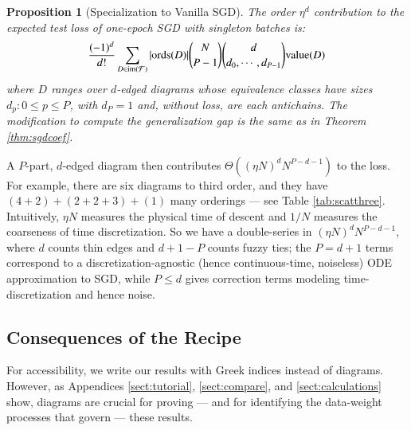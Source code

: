 \documentclass{article}
\theoremstyle{plain}
\newtheorem{prop}{Proposition}
\theoremstyle{definition}
\newcommand{\Free}{\mathcal{F}}
\newcommand{\image}{\text{\textnormal{im}}}
\newcommand{\dvalue}{\text{\textnormal{value}}}
\newcommand{\ords}{\text{\textnormal{ords}}}
\begin{document}
        \begin{prop}[Specialization to Vanilla SGD] \label{prop:vanilla}
            The order $\eta^d$ contribution to the expected test loss of
            one-epoch SGD with singleton batches is:
            \begin{equation*}\label{eq:sgdbasiccoef}
                \frac{(-1)^d}{d!} \sum_{D\in \image(\Free)} 
                |\ords(D)| {N \choose P-1} {d \choose d_0,\cdots,d_{P-1}}
                \dvalue(D)
            \end{equation*}
            where $D$ ranges over $d$-edged diagrams whose equivalence classes
            have sizes $d_p: 0\leq p\leq P$, with $d_P=1$
            and, without loss, are each antichains.  The modification to
            compute the generalization gap is the same as in Theorem
            \ref{thm:sgdcoef}.
        \end{prop}
        A $P$-part, $d$-edged diagram then contributes $\Theta\left((\eta N)^d
        N^{P-d-1}\right)$ to the loss.  For example, there are six diagrams to
        third order, and they have $(4+2)+(2+2+3)+(1)$ many orderings --- see
        Table \ref{tab:scatthree}.  Intuitively, $\eta N$ measures the physical
        time of descent and $1/N$ measures the coarseness of time
        discretization.  So we have a double-series in $(\eta N)^d N^{P-d-1}$,
        where $d$ counts thin edges and $d+1-P$ counts fuzzy ties; the $P=d+1$
        terms correspond to a discretization-agnostic (hence continuous-time,
        noiseless) ODE approximation to SGD, while $P\leq d$ gives correction
        terms modeling time-discretization and hence noise.  


    \subsection{Consequences of the Recipe}
        For accessibility, we write our results with Greek indices instead of
        diagrams.  However, as Appendices \ref{sect:tutorial},
        \ref{sect:compare}, and \ref{sect:calculations} show, diagrams are
        crucial for proving --- and for identifying the data-weight processes
        that govern --- these results.
\end{document}
